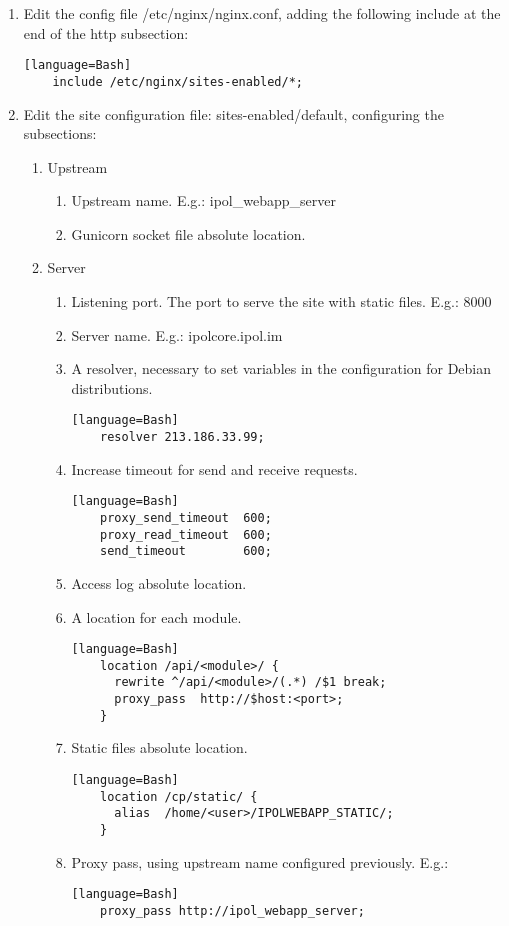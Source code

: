 \documentclass[a4paper,12pt]{article}
\begin{document}
\begin{enumerate}
    \item Edit the config file /etc/nginx/nginx.conf, adding the following include at the end of the http subsection:
    \begin{verbatim}[language=Bash]
    include /etc/nginx/sites-enabled/*;
    \end{verbatim}
    \item Edit the site configuration file: sites-enabled/default, configuring the subsections:
    \begin{enumerate}
    \item Upstream
    \begin{enumerate}
    \item Upstream name. E.g.: ipol\_webapp\_server
    \item Gunicorn socket file absolute location.
    \end{enumerate}
    \item Server
    \begin{enumerate}
    \item Listening port. The port to serve the site with static files. E.g.: 8000
    \item Server name. E.g.: ipolcore.ipol.im
    \item A resolver, necessary to set variables in the configuration for Debian distributions.
    \begin{verbatim}[language=Bash]
    resolver 213.186.33.99;
    \end{verbatim}
    \item Increase timeout for send and receive requests.
    \begin{verbatim}[language=Bash]
    proxy_send_timeout	600;
    proxy_read_timeout	600;
    send_timeout		600;
    \end{verbatim}
    \item Access log absolute location.
    \item A location for each module.
    \begin{verbatim}[language=Bash]
    location /api/<module>/ {
      rewrite ^/api/<module>/(.*) /$1 break;
      proxy_pass  http://$host:<port>;
    }
    \end{verbatim}
    \item Static files absolute location.
    \begin{verbatim}[language=Bash]
    location /cp/static/ {
      alias  /home/<user>/IPOLWEBAPP_STATIC/;
    }
    \end{verbatim}
    \item Proxy pass, using upstream name configured previously.
    E.g.:
    \begin{verbatim}[language=Bash]
    proxy_pass http://ipol_webapp_server;
    \end{verbatim}

    \end{enumerate}
    \end{enumerate}
\end{enumerate}
\end{document}
